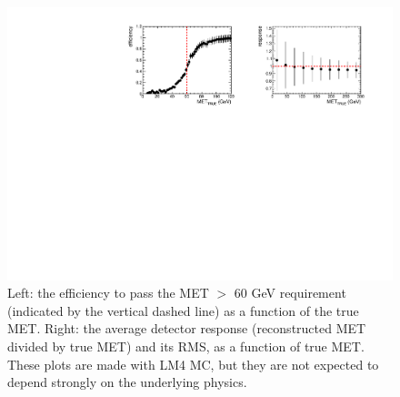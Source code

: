 \begin{figure}[tbh]
\begin{center}
\includegraphics[width=1.0\linewidth]{plots/LM4_met_resp_eff.pdf}
\caption{\label{fig:LM4_met}\protect 
Left: the efficiency to pass the MET $>$ 60 GeV requirement (indicated by the vertical dashed line)
as a function of the true MET. Right: the average detector response (reconstructed MET divided by true MET) 
and its RMS, as a function of true MET. These plots are made with LM4 MC, but they are not expected to depend
strongly on the underlying physics.}
\end{center}
\end{figure}